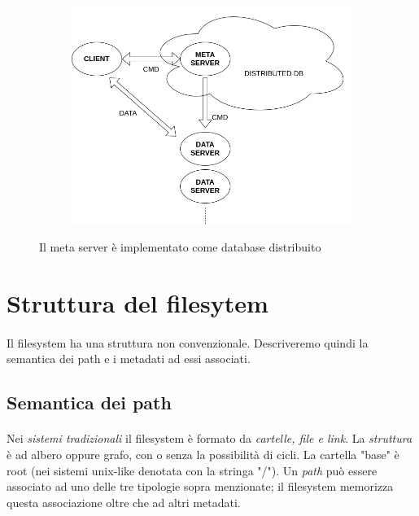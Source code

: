 \documentclass[11pt,a4paper,english]{article}
\begin{document}
\begin{figure}[H]
	\centering
	\begin{subfigure}{0.80\linewidth}
		\includegraphics[width=\linewidth]{../diagrams/architettura/7.png}
	\end{subfigure}
	\caption{Il meta server è implementato come database distribuito}
\end{figure}


\section{Struttura del filesytem}

\paragraph{} Il filesystem ha una struttura non convenzionale. Descriveremo quindi la semantica dei path e i metadati ad essi associati. 

\subsection{Semantica dei path}

\paragraph{} Nei \emph{sistemi tradizionali} il filesystem è formato da \emph{cartelle, file e link}. La \emph{struttura} è ad albero oppure grafo, con o senza la possibilità di cicli. La cartella "base" è root (nei sistemi unix-like denotata con la stringa "/"). Un \emph{path} può essere associato ad uno delle tre tipologie sopra menzionate; il filesystem memorizza questa associazione oltre che ad altri metadati. 
\end{document}
